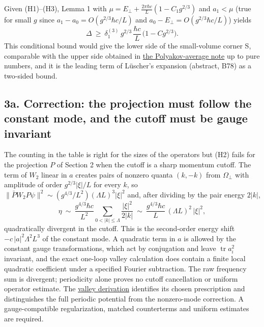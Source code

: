 \documentclass[11pt,a4paper]{article}
\begin{document}
Given (H1)--(H3), Lemma 1 with
\(\mu=E_\perp+\frac{2\pi\hbar c}{L}(1-C_1g^{2/3})\) and \(a_1<\mu\)
(true for small \(g\) since \(a_1-a_0=O(g^{2/3}\hbar c/L)\) and
\(a_0-E_\perp=O(g^{2/3}\hbar c/L)\)) yields
\[\Delta\ \ge\ \delta_1^{(3)}\,g^{2/3}\,\frac{\hbar c}{L}\,\big(1-Cg^{2/3}\big).\]
This conditional bound would give the lower side of the small-volume
corner S, comparable with the upper side obtained in
\href{lattice-gap-upper-bounds.md\#spatial-polyakov-loop-trials}{the
Polyakov-average note} up to pure numbers, and it is the leading term of
Lüscher's expansion (abstract, B78) as a two-sided bound.

\hypertarget{a.-correction-the-projection-must-follow-the-constant-mode-and-the-cutoff-must-be-gauge-invariant}{%
\subsection{3a. Correction: the projection must follow the constant
mode, and the cutoff must be gauge
invariant}\label{a.-correction-the-projection-must-follow-the-constant-mode-and-the-cutoff-must-be-gauge-invariant}}

The counting in the table is right for the sizes of the operators but
(H2) fails for the projection \(P\) of Section 2 when the cutoff is a
sharp momentum cutoff. The term of \(W_2\) linear in \(a\) creates pairs
of nonzero quanta \((k,-k)\) from \(\Omega_\perp\) with amplitude of
order \(g^{2/3}|\xi|/L\) for every \(k\), so
\(\|\bar PW_2P\psi\|^2\sim(g^{4/3}/L^2)(\Lambda L)^3|\xi|^2\) and, after
dividing by the pair energy \(2|k|\),
\[\eta\ \sim\ \frac{g^{4/3}\hbar c}{L^2}\sum_{0<|k|\le\Lambda}\frac{|\xi|^2}{2|k|} \ \sim\ \frac{g^{4/3}\hbar c}{L}\,(\Lambda L)^2\,|\xi|^2 ,\]
quadratically divergent in the cutoff. This is the second-order energy
shift \(-c\,|a|^2\Lambda^2L^3\) of the constant mode. A quadratic term
in \(a\) is allowed by the constant gauge transformations, which act by
conjugation and leave \(\operatorname{tr}a_i^2\) invariant, and the
exact one-loop valley calculation does contain a finite local quadratic
coefficient under a specified Fourier subtraction. The raw frequency sum
is divergent; periodicity alone proves no cutoff cancellation or uniform
operator estimate. The \href{torus-valley-potential.md}{valley
derivation} identifies its chosen prescription and distinguishes the
full periodic potential from the nonzero-mode correction. A
gauge-compatible regularization, matched counterterms and uniform
estimates are required.
\end{document}
